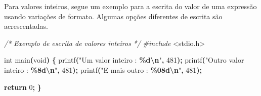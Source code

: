 \documentclass[
  11pt,
  a4paper,
]{scrbook}
\newenvironment{Shaded}{\begin{snugshade}}{\end{snugshade}}
\newcommand{\CommentTok}[1]{\textcolor[rgb]{0.56,0.35,0.01}{\textit{#1}}}
\newcommand{\ControlFlowTok}[1]{\textcolor[rgb]{0.13,0.29,0.53}{\textbf{#1}}}
\newcommand{\DataTypeTok}[1]{\textcolor[rgb]{0.13,0.29,0.53}{#1}}
\newcommand{\DecValTok}[1]{\textcolor[rgb]{0.00,0.00,0.81}{#1}}
\newcommand{\FloatTok}[1]{\textcolor[rgb]{0.00,0.00,0.81}{#1}}
\newcommand{\ImportTok}[1]{#1}
\newcommand{\NormalTok}[1]{#1}
\newcommand{\OperatorTok}[1]{\textcolor[rgb]{0.81,0.36,0.00}{\textbf{#1}}}
\newcommand{\PreprocessorTok}[1]{\textcolor[rgb]{0.56,0.35,0.01}{\textit{#1}}}
\newcommand{\SpecialCharTok}[1]{\textcolor[rgb]{0.81,0.36,0.00}{\textbf{#1}}}
\newcommand{\StringTok}[1]{\textcolor[rgb]{0.31,0.60,0.02}{#1}}
\begin{document}
\begin{Shaded}
\end{Shaded}

\begin{Shaded}
\end{Shaded}

Para valores inteiros, segue um exemplo para a escrita do valor de uma
expressão usando variações de formato. Algumas opções diferentes de
escrita são acrescentadas.

\begin{Shaded}
\begin{Highlighting}[]
\CommentTok{/*}
\CommentTok{Exemplo de escrita de valores inteiros}
\CommentTok{*/}
\PreprocessorTok{\#include }\ImportTok{\textless{}stdio.h\textgreater{}}

\DataTypeTok{int}\NormalTok{ main}\OperatorTok{(}\DataTypeTok{void}\OperatorTok{)} \OperatorTok{\{}
\NormalTok{    printf}\OperatorTok{(}\StringTok{"Um valor inteiro    : }\SpecialCharTok{\%d\textbackslash{}n}\StringTok{"}\OperatorTok{,} \DecValTok{481}\OperatorTok{);}
\NormalTok{    printf}\OperatorTok{(}\StringTok{"Outro valor inteiro : }\SpecialCharTok{\%8d\textbackslash{}n}\StringTok{"}\OperatorTok{,} \DecValTok{481}\OperatorTok{);}
\NormalTok{    printf}\OperatorTok{(}\StringTok{"E mais outro        : }\SpecialCharTok{\%08d\textbackslash{}n}\StringTok{"}\OperatorTok{,} \DecValTok{481}\OperatorTok{);}

    \ControlFlowTok{return} \DecValTok{0}\OperatorTok{;}
\OperatorTok{\}}
\end{Highlighting}
\end{Shaded}
\end{document}
